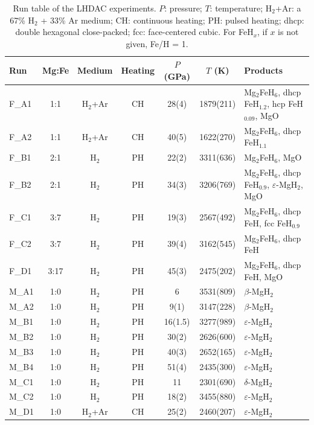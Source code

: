 \documentclass[draft,jgrga,12pt]{agujournal2019}
\begin{document}
\begin{table}[!h]
    \centering
    \caption{Run table of the LHDAC experiments. 
    $P$: pressure; $T$: temperature; H$_2$+Ar: a 67\% H$_2$ + 33\% Ar medium;
    CH: continuous heating; PH: pulsed heating; 
    dhcp: double hexagonal close-packed; fcc: face-centered cubic. 
    For FeH$_x$, if $x$ is not given, Fe/H = 1. }
    {\scriptsize
    \begin{tabular}{lcccccl}
    \hline
     Run   & Mg:Fe & Medium & Heating &$P$ (GPa) & $T$ (K) & Products \\
     \hline
     F\_A1    & 1:1  & H$_2$+Ar & CH & 28(4) & 1879(211) &  Mg$_2$FeH$_6$, dhcp FeH$_{1.2}$, hcp FeH$_{0.09}$, MgO\\
     F\_A2    & 1:1  & H$_2$+Ar  & CH & 40(5) & 1622(270) &  Mg$_2$FeH$_6$, dhcp FeH$_{1.1}$ \\
     F\_B1    & 2:1  & H$_2$  & PH   & 22(2) & 3311(636)&  Mg$_2$FeH$_6$, MgO \\
     F\_B2    & 2:1  & H$_2$ &PH  & 34(3) & 3206(769)&  Mg$_2$FeH$_6$, dhcp FeH$_{0.9}$, $\varepsilon$-MgH$_2$, MgO \\
     F\_C1    & 3:7  & H$_2$ &PH & 19(3) & 2567(492) &  Mg$_2$FeH$_6$, dhcp FeH, fcc FeH$_{0.9}$ \\
     F\_C2    & 3:7  & H$_2$ &PH  & 39(4) & 3162(545) &  Mg$_2$FeH$_6$, dhcp FeH \\
     F\_D1    & 3:17 & H$_2$ &PH & 45(3)& 2475(202) &  Mg$_2$FeH$_6$, dhcp FeH, MgO \\

       M\_A1   & 1:0 & H$_2$ &PH & 6      & 3531(809)  & $\beta$-MgH$_2$ \\
      M\_A2   & 1:0 & H$_2$ &PH & 9(1)   & 3147(228)  & $\beta$-MgH$_2$  \\
      M\_B1  & 1:0 & H$_2$ &PH & 16(1.5) & 3277(989) & $\varepsilon$-MgH$_2$ \\
      M\_B2  & 1:0 & H$_2$ &PH & 30(2)   & 2626(600) & $\varepsilon$-MgH$_2$ \\
      M\_B3  & 1:0 & H$_2$ &PH & 40(3)   & 2652(165) & $\varepsilon$-MgH$_2$ \\
      M\_B4 & 1:0 & H$_2$ &PH  & 51(4)   & 2435(300) & $\varepsilon$-MgH$_2$ \\
      M\_C1  & 1:0 & H$_2$ &PH & 11      & 2301(690) & $\delta$-MgH$_2$ \\
      M\_C2  & 1:0 & H$_2$ &PH & 18(2)   & 3455(880) & $\varepsilon$-MgH$_2$\\
      M\_D1  & 1:0 & H$_2$+Ar &CH & 25(2)   & 2460(207) & $\varepsilon$-MgH$_2$\\
      
     \hline
    \end{tabular}}
    \label{tab:runtable}
\end{table}
\end{document}
